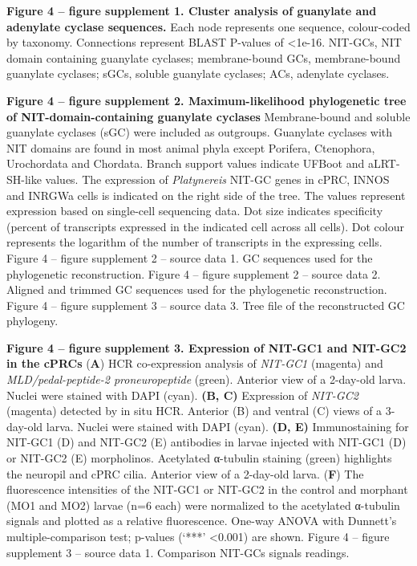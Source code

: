 \documentclass[
  11pt,
  letterpaper,
  DIV=11,
  numbers=noendperiod]{scrartcl}
\begin{document}
\textbf{Figure 4 -- figure supplement 1. Cluster analysis of guanylate
and adenylate cyclase sequences.} Each node represents one sequence,
colour-coded by taxonomy. Connections represent BLAST P-values of
\textless1e-16. NIT-GCs, NIT domain containing guanylate cyclases;
membrane-bound GCs, membrane-bound guanylate cyclases; sGCs, soluble
guanylate cyclases; ACs, adenylate cyclases.

\textbf{Figure 4 -- figure supplement 2. Maximum-likelihood phylogenetic
tree of NIT-domain-containing guanylate cyclases} Membrane-bound and
soluble guanylate cyclases (sGC) were included as outgroups. Guanylate
cyclases with NIT domains are found in most animal phyla except
Porifera, Ctenophora, Urochordata and Chordata. Branch support values
indicate UFBoot and aLRT-SH-like values. The expression of
\emph{Platynereis} NIT-GC genes in cPRC, INNOS and INRGWa cells is
indicated on the right side of the tree. The values represent expression
based on single-cell sequencing data. Dot size indicates specificity
(percent of transcripts expressed in the indicated cell across all
cells). Dot colour represents the logarithm of the number of transcripts
in the expressing cells. Figure 4 -- figure supplement 2 -- source data
1. GC sequences used for the phylogenetic reconstruction. Figure 4 --
figure supplement 2 -- source data 2. Aligned and trimmed GC sequences
used for the phylogenetic reconstruction. Figure 4 -- figure supplement
3 -- source data 3. Tree file of the reconstructed GC phylogeny.

\textbf{Figure 4 -- figure supplement 3. Expression of NIT-GC1 and
NIT-GC2 in the cPRCs} (\textbf{A}) HCR co-expression analysis of
\emph{NIT-GC1} (magenta) and \emph{MLD/pedal-peptide-2 proneuropeptide}
(green). Anterior view of a 2-day-old larva. Nuclei were stained with
DAPI (cyan). \textbf{(B, C)} Expression of \emph{NIT-GC2} (magenta)
detected by in situ HCR. Anterior (B) and ventral (C) views of a
3-day-old larva. Nuclei were stained with DAPI (cyan). \textbf{(D, E)}
Immunostaining for NIT-GC1 (D) and NIT-GC2 (E) antibodies in larvae
injected with NIT-GC1 (D) or NIT-GC2 (E) morpholinos. Acetylated
α-tubulin staining (green) highlights the neuropil and cPRC cilia.
Anterior view of a 2-day-old larva. (\textbf{F}) The fluorescence
intensities of the NIT-GC1 or NIT-GC2 in the control and morphant (MO1
and MO2) larvae (n=6 each) were normalized to the acetylated α-tubulin
signals and plotted as a relative fluorescence. One-way ANOVA with
Dunnett's multiple-comparison test; p-values (`***' \textless0.001) are
shown. Figure 4 -- figure supplement 3 -- source data 1. Comparison
NIT-GCs signals readings.
\end{document}
